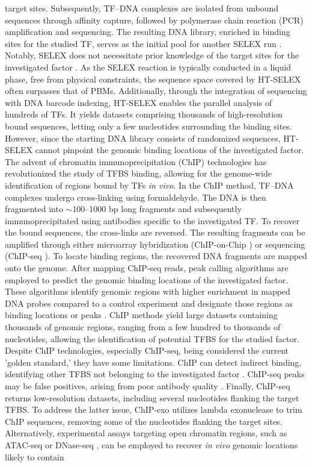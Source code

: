 \documentclass[a4paper, titlepage, openright]{book}
\begin{document}
target sites. Subsequently, TF–DNA complexes are isolated from unbound sequences through affinity capture, followed by polymerase chain reaction (PCR) amplification and sequencing. The resulting DNA library, enriched in binding sites for the studied TF, serves as the initial pool for another SELEX run \citep{jolma2011methods,jolma2010multiplexed}. Notably, SELEX does not necessitate prior knowledge of the target sites for the investigated factor \citep{jolma2013dna}. As the SELEX reaction is typically conducted in a liquid phase, free from physical constraints, the sequence space covered by HT-SELEX often surpasses that of PBMs. Additionally, through the integration of sequencing with DNA barcode indexing, HT-SELEX enables the parallel analysis of hundreds of TFs. It yields datasets comprising thousands of high-resolution bound sequences, letting only a few nucleotides surrounding the binding sites. However, since the starting DNA library consists of randomized sequences, HT-SELEX cannot pinpoint the genomic binding locations of the investigated factor. The advent of chromatin immunoprecipitation (ChIP) technologies \citep{collas2008chop} has revolutionized the study of TFBS binding, allowing for the genome-wide identification of regions bound by TFs \emph{in vivo}. In the ChIP method, TF–DNA complexes undergo cross-linking using formaldehyde. The DNA is then fragmented into $\sim$100–1000 bp long fragments and subsequently immunoprecipitated using antibodies specific to the investigated TF. To recover the bound sequences, the cross-links are reversed. The resulting fragments can be amplified through either microarray hybridization (ChIP-on-Chip \citep{collas2008chop,pillai2015chip}) or sequencing (ChIP-seq \citep{johnson2007genome,mardis2007chip}). To locate binding regions, the recovered DNA fragments are mapped onto the genome. After mapping ChIP-seq reads, peak calling algorithms \citep{thomas2017features,guo2012high,zhang2008model} are employed to predict the genomic binding locations of the investigated factor. These algorithms identify genomic regions with higher enrichment in mapped DNA probes compared to a control experiment and designate those regions as binding locations or peaks \citep{pepke2009computation}. ChIP methods yield large datasets containing thousands of genomic regions, ranging from a few hundred to thousands of nucleotides, allowing the identification of potential TFBS for the studied factor. Despite ChIP technologies, especially ChIP-seq, being considered the current 'golden standard,' they have some limitations. ChIP can detect indirect binding, identifying other TFBS not belonging to the investigated factor \citep{worsley2014non}. ChIP-seq peaks may be false positives, arising from poor antibody quality \citep{pickrell2011false}. Finally, ChIP-seq returns low-resolution datasets, including several nucleotides flanking the target TFBS. To address the latter issue, ChIP-exo \citep{rhee2011comprehensive} utilizes lambda exonuclease to trim ChIP sequences, removing some of the nucleotides flanking the target sites. Alternatively, experimental assays targeting open chromatin regions, such as ATAC-seq \citep{buenrostro2013transposition} or DNase-seq \citep{john2011chromatin}, can be employed to recover \emph{in vivo} genomic locations likely to contain 
\end{document}
